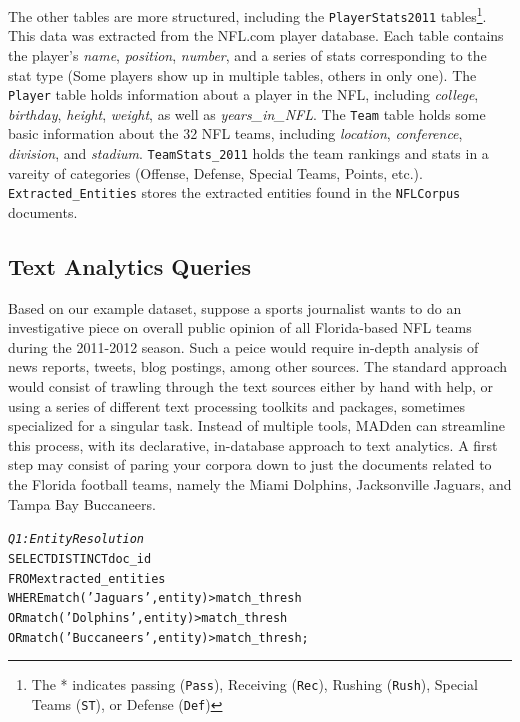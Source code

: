 The other tables are more structured,
including the {\tt PlayerStats2011} tables\footnote{The * indicates passing ({\tt Pass}),
Receiving ({\tt Rec}), Rushing ({\tt Rush}), Special Teams ({\tt ST}), or
Defense ({\tt Def})\label{fn:playerstats}}.
This data was extracted from the NFL.com player database. Each table contains
the player's \textit{name}, \textit{position}, \textit{number}, and a series of
stats corresponding to the stat type (Some players show up in multiple tables, others in only one). The
{\tt Player} table holds information about a player in the NFL, including
\textit{college}, \textit{birthday}, \textit{height}, \textit{weight}, as well
as \textit{years\_in\_NFL}. The {\tt Team} table holds some basic information
about the 32 NFL teams, including \textit{location}, \textit{conference}, \textit{division}, and \textit{stadium}.
{\tt TeamStats\_2011} holds the team rankings and stats in a vareity of categories (Offense, Defense, Special Teams,
Points, etc.).
{\tt Extracted\_Entities} stores the
extracted entities found in the {\tt NFLCorpus} documents.



\subsection{Text Analytics Queries}
Based on our example dataset, suppose a sports journalist
wants to do an investigative piece on overall public opinion 
of all Florida-based NFL teams during the 2011-2012 season. 
Such a peice would require in-depth analysis of news reports,
tweets, blog postings, among other sources. The standard approach would
consist of trawling through the text sources either by hand
with help, or using a series of different text processing
toolkits and packages, sometimes specialized for a singular 
task. Instead of multiple tools, MADden can streamline this process, with its
declarative, in-database approach to text analytics. A first step may 
consist of paring your corpora down to just
the documents related to the Florida football teams, namely
the Miami Dolphins, Jacksonville Jaguars, and Tampa Bay Buccaneers. 

\begin{small}
\begin{alltt}
\textit{Q1: Entity Resolution}
SELECT DISTINCT doc_id
FROM extracted_entities
WHERE match('Jaguars', entity) > match\_thresh
   OR match('Dolphins', entity) > match\_thresh
   OR match('Buccaneers', entity) > match\_thresh;
\end{alltt}
\end{small}

